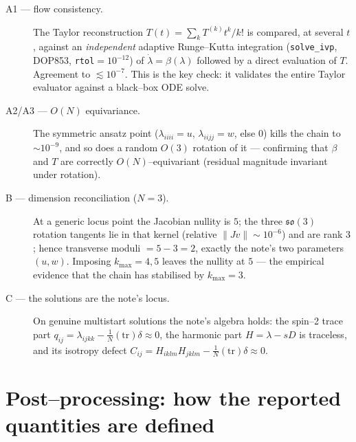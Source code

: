 \documentclass[11pt]{article}
\newcommand{\tr}{\mathrm{tr}}
\newcommand{\norm}[1]{\lVert #1\rVert}
\newcommand{\code}[1]{\texttt{#1}}
\begin{document}
\begin{description}
\item[A1 --- flow consistency.] The Taylor reconstruction
$T(t)=\sum_k T^{(k)}t^k/k!$ is compared, at several $t$, against an
\emph{independent} adaptive Runge--Kutta integration (\code{solve\_ivp},
DOP853, \code{rtol}$=10^{-12}$) of $\dot\lambda=\beta(\lambda)$ followed by a
direct evaluation of $T$. Agreement to $\lesssim10^{-7}$. This is the key
check: it validates the entire Taylor evaluator against a black--box ODE solve.
\item[A2/A3 --- $O(N)$ equivariance.] The symmetric ansatz point
($\lambda_{iiii}=u$, $\lambda_{iijj}=w$, else $0$) kills the chain to
$\sim10^{-9}$, and so does a random $O(3)$ rotation of it --- confirming that
$\beta$ and $T$ are correctly $O(N)$--equivariant (residual magnitude invariant
under rotation).
\item[B --- dimension reconciliation ($N=3$).] At a generic locus point the
Jacobian nullity is $5$; the three $\mathfrak{so}(3)$ rotation tangents lie in
that kernel (relative $\norm{J v}\sim10^{-6}$) and are rank $3$; hence
transverse moduli $=5-3=2$, exactly the note's two parameters $(u,w)$.
Imposing $k_{\max}=4,5$ leaves the nullity at $5$ --- the empirical evidence
that the chain has stabilised by $k_{\max}=3$.
\item[C --- the solutions are the note's locus.] On genuine multistart
solutions the note's algebra holds: the spin--2 trace part
$q_{ij}=\lambda_{ijkk}-\tfrac1N(\tr)\delta\approx0$, the harmonic part
$H=\lambda-sD$ is traceless, and its isotropy defect
$C_{ij}=H_{iklm}H_{jklm}-\tfrac1N(\tr)\delta\approx0$.
\end{description}

\section{Post--processing: how the reported quantities are defined}
\label{sec:postproc}
\end{document}
